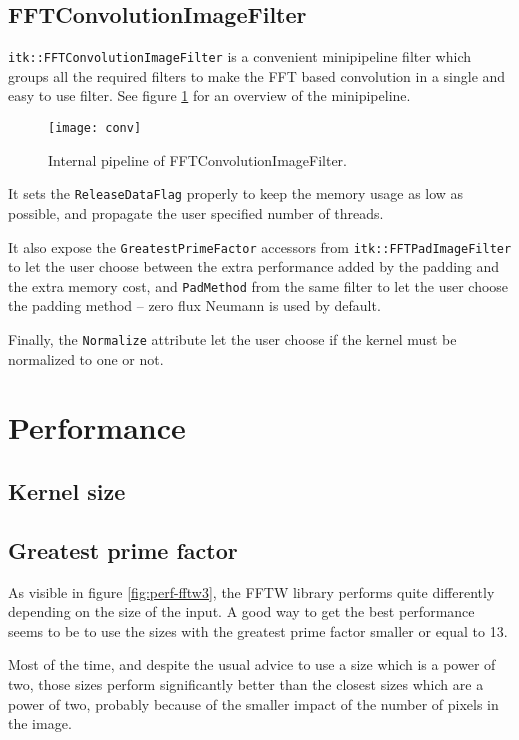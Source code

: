 \documentclass{InsightArticle}
\begin{document}
\subsection{FFTConvolutionImageFilter}

\verb$itk::FFTConvolutionImageFilter$ is a convenient minipipeline filter which groups all the required
filters to make the FFT based convolution in a single and easy to use filter. See figure \ref{fig:conv-pipeline}
for an overview of the minipipeline.
\begin{figure}[htbp]
\centering
\texttt{[image: conv]}
\caption{Internal pipeline of FFTConvolutionImageFilter.\label{fig:conv-pipeline}}
\end{figure}

It sets the \verb$ReleaseDataFlag$ properly to keep the memory usage as low as possible, and propagate the
user specified number of threads.

It also expose the \verb$GreatestPrimeFactor$ accessors from \verb$itk::FFTPadImageFilter$ to let
the user choose between the extra performance added by the padding and the extra memory cost, and
\verb$PadMethod$ from the same filter to let the user choose the padding method -- zero flux Neumann
is used by default.

Finally, the \verb$Normalize$ attribute let the user choose if the kernel must be normalized to one
or not.

\section{Performance}

\subsection{Kernel size}

\subsection{Greatest prime factor}
\label{perf:gpf}
As visible in figure \ref{fig:perf-fftw3}, the FFTW library performs quite differently depending on the
size of the input. A good way to get the best performance seems to be to use the sizes with the greatest
prime factor smaller or equal to 13.

Most of the time, and despite the usual advice to use a size which is a power of two,
those sizes perform significantly better than the closest sizes which are a power of two, probably
because of the smaller impact of the number of pixels in the image.
\end{document}
